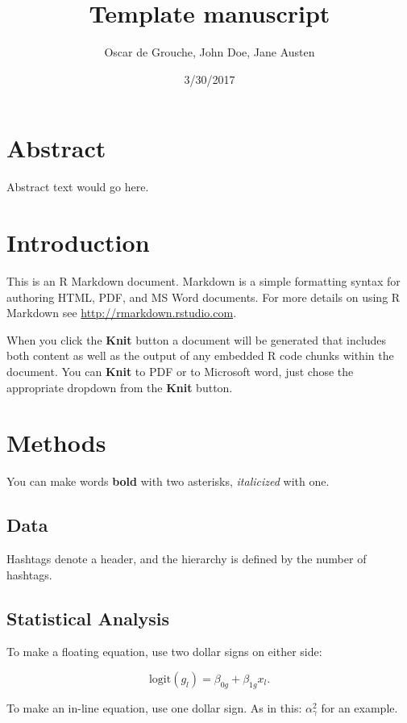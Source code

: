 \documentclass[]{article}
\title{Template manuscript}
\author{Oscar de Grouche, John Doe, Jane Austen}
\date{3/30/2017}
\begin{document}
\maketitle

\section{Abstract}\label{abstract}

Abstract text would go here.

\section{Introduction}\label{introduction}

This is an R Markdown document. Markdown is a simple formatting syntax
for authoring HTML, PDF, and MS Word documents. For more details on
using R Markdown see \url{http://rmarkdown.rstudio.com}.

When you click the \textbf{Knit} button a document will be generated
that includes both content as well as the output of any embedded R code
chunks within the document. You can \textbf{Knit} to PDF or to Microsoft
word, just chose the appropriate dropdown from the \textbf{Knit} button.

\section{Methods}\label{methods}

You can make words \textbf{bold} with two asterisks, \emph{italicized}
with one.

\subsection{Data}\label{data}

Hashtags denote a header, and the hierarchy is defined by the number of
hashtags.

\subsection{Statistical Analysis}\label{statistical-analysis}

To make a floating equation, use two dollar signs on either side:

\[
\text{logit}(g_l) = \beta_{0g} + \beta_{1g}x_l.
\]

To make an in-line equation, use one dollar sign. As in this:
\(\alpha_\gamma^2\) for an example.
\end{document}
